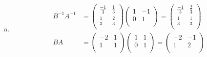 \documentclass{standalone}
\begin{document}
\begin{enumerate}[a)]
\begin{align*}
\begin{array}{rr}
        1 & -1 \\
        0 & 1 \\
        \end{array}\right)\left(\begin{array}{rr}
        \frac{-1}{3} & \frac{1}{3} \\
        \frac{1}{3} & \frac{2}{3} \\
        \end{array}\right) = \left(\begin{array}{rr}
        \frac{-2}{3} & \frac{-1}{3} \\
        \frac{1}{3} & \frac{2}{3} \\
        \end{array}\right) \\
    \end{align*}

\item
    \begin{align*}
        B^{-1}A^{-1} &= \left(\begin{array}{rr}
        \frac{-1}{3} & \frac{1}{3} \\
        \frac{1}{3} & \frac{2}{3} \\
        \end{array}\right)\left(\begin{array}{rr}
        1 & -1 \\
        0 & 1 \\
        \end{array}\right) = \left(\begin{array}{rr}
        \frac{-1}{3} & \frac{2}{3} \\
        \frac{1}{3} & \frac{1}{3} \\
        \end{array}\right) \\
        BA &= \left(\begin{array}{rr}
        -2 & 1 \\
        1 & 1 \\
        \end{array}\right)\left(\begin{array}{rr}
        1 & 1 \\
        0 & 1 \\
        \end{array}\right) = \left(\begin{array}{rr}
        -2 & -1 \\
        1 & 2 \\
        \end{array}\right) \\
    \end{align*}

\end{enumerate}
\end{document}
